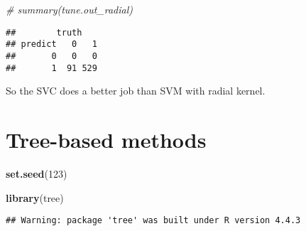 \documentclass[
]{article}
\newenvironment{Shaded}{\begin{snugshade}}{\end{snugshade}}
\newcommand{\AttributeTok}[1]{\textcolor[rgb]{0.13,0.29,0.53}{#1}}
\newcommand{\CommentTok}[1]{\textcolor[rgb]{0.56,0.35,0.01}{\textit{#1}}}
\newcommand{\ConstantTok}[1]{\textcolor[rgb]{0.56,0.35,0.01}{#1}}
\newcommand{\DecValTok}[1]{\textcolor[rgb]{0.00,0.00,0.81}{#1}}
\newcommand{\FloatTok}[1]{\textcolor[rgb]{0.00,0.00,0.81}{#1}}
\newcommand{\FunctionTok}[1]{\textcolor[rgb]{0.13,0.29,0.53}{\textbf{#1}}}
\newcommand{\NormalTok}[1]{#1}
\newcommand{\OtherTok}[1]{\textcolor[rgb]{0.56,0.35,0.01}{#1}}
\newcommand{\SpecialCharTok}[1]{\textcolor[rgb]{0.81,0.36,0.00}{\textbf{#1}}}
\newcommand{\StringTok}[1]{\textcolor[rgb]{0.31,0.60,0.02}{#1}}
\begin{document}
\begin{Shaded}
\begin{Highlighting}[]
\CommentTok{\# summary(tune.out\_radial)}
\end{Highlighting}
\end{Shaded}

\begin{Shaded}
\end{Shaded}

\begin{verbatim}
##        truth
## predict   0   1
##       0   0   0
##       1  91 529
\end{verbatim}

So the SVC does a better job than SVM with radial kernel.

\section{Tree-based methods}\label{tree-based-methods}

\begin{Shaded}
\begin{Highlighting}[]
\FunctionTok{set.seed}\NormalTok{(}\DecValTok{123}\NormalTok{)}

\FunctionTok{library}\NormalTok{(tree)}
\end{Highlighting}
\end{Shaded}

\begin{verbatim}
## Warning: package 'tree' was built under R version 4.4.3
\end{verbatim}
\end{document}
